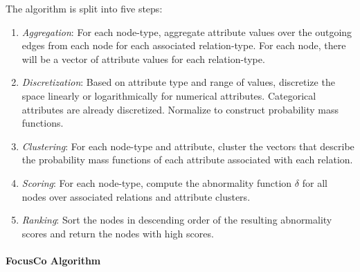 \documentclass[11pt, oneside]{article}   	%
\begin{document}
\quad The algorithm is split into five steps:
\begin{enumerate}
\item \emph{Aggregation}: For each node-type, aggregate attribute values over the outgoing edges from each node for each associated relation-type.
For each node, there will be a vector of attribute values for each relation-type.
\item \emph{Discretization}: Based on attribute type and range of values, discretize the space linearly or logarithmically for numerical attributes.
Categorical attributes are already discretized.
Normalize to construct probability mass functions.
\item \emph{Clustering}: For each node-type and attribute, cluster the vectors that describe the probability mass functions of each attribute associated with each relation.
\item \emph{Scoring}: For each node-type, compute the abnormality function $\delta$ for all nodes over associated relations and attribute clusters.
\item \emph{Ranking}: Sort the nodes in descending order of the resulting abnormality scores and return the nodes with high scores.
\end{enumerate}

\paragraph{FocusCo Algorithm}
\quad
\end{document}
